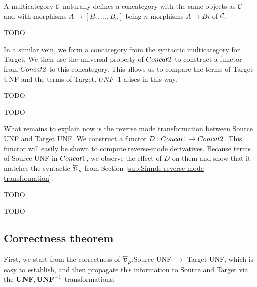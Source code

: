 \begin{definition}
    A multicategory $\mathcal{C}$ naturally defines a concategory with the same objects as $\mathcal{C}$ and
    with morphisms $A\to [B_1,\ldots,B_n]$ being $n$ morphisms $A\to Bi$ of $\mathcal{C}$. 
\end{definition}

\begin{proposition}
    TODO
\end{proposition}

In a similar vein, we form a concategory from the syntactic multicategory for Target.
We then use the universal property of $Concat2$ to construct a functor from $Concat2$ to this concategory.
This allows us to compare the terms of Target UNF and the terms of Target. 
$UNF^-1$ arises in this way.

\begin{definition}
    TODO
\end{definition}

\begin{proposition}
    TODO
\end{proposition}

What remains to explain now is the reverse mode transformation between Source UNF and Target UNF.
We construct a functor $D:Concat1\to Concat2$. 
This functor will easily be shown to compute reverse-mode derivatives.
Because terms of Source UNF in $Concat1$, we observe the effect of $D$ on them
and show that it matches the syntactic $\Dsynrevsymbol_{\rho}$ 
from Section~\ref{sub:Simple reverse mode transformation}.

\begin{definition}
    TODO
\end{definition}

\begin{proposition}
    TODO
\end{proposition}


\subsection{Correctness theorem} %
\label{sub:Correctness theorem}

First, we start from the correctness of $\Dsynrevsymbol_{\rho}$:Source UNF $\to$ Target UNF, which is easy to establish, 
and then propagate this information to Source and Target via the $\mathbf{UNF}, \mathbf{UNF}^{-1}$ transformations.

